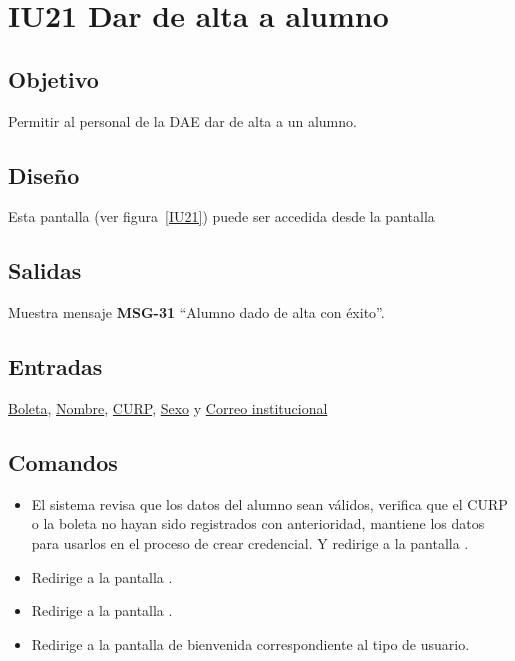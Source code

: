 
\section{IU21 Dar de alta a alumno}

\subsection{Objetivo}
	Permitir al personal de la DAE dar de alta a un alumno.
\subsection{Diseño}
    Esta pantalla  (ver figura~\ref{IU21}) puede ser accedida desde la pantalla 


\subsection{Salidas}
Muestra mensaje {\bf MSG-31} ``Alumno dado de alta con éxito''.
\subsection{Entradas}
    \hyperlink{Alumno.Boleta}{Boleta}, \hyperlink{Alumno.Nombre}{Nombre}, \hyperlink{Alumno.CURP}{CURP}, \hyperlink{Alumno.Sexo}{Sexo} y \hyperlink{Alumno.Correo institucional}{Correo institucional}
\subsection{Comandos}
\begin{itemize}
    \item {}  El sistema revisa que los datos del alumno sean válidos, verifica que el CURP o la boleta no hayan sido registrados con anterioridad, mantiene los datos para usarlos en el proceso de crear credencial. Y redirige a la pantalla .
    \item {} Redirige a la pantalla .
    \item {} Redirige a la pantalla .
    \item {} Redirige a la pantalla de bienvenida correspondiente al tipo de usuario.
    
\end{itemize}

